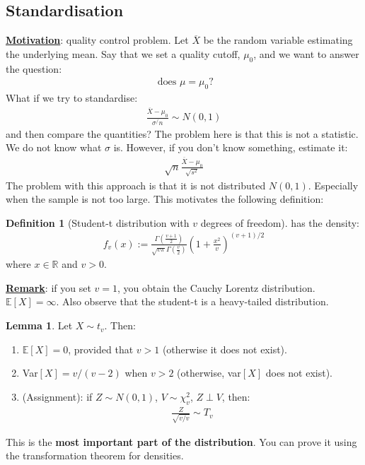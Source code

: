 \documentclass[11pt]{scrartcl}
\newcommand{\R}[0]{\mathbb{R}}
\theoremstyle{definition}
\newtheorem{lemma}[theorem]{Lemma}
\newtheorem{definition}{Definition}
\theoremstyle{remark}
\newcommand{\dfn}[1]{\textbf{\underline{#1}}}
\newcommand{\EX}[1]{\mathbb{E}\left[#1 \right]}
\begin{document}
{\subsection{Standardisation}
\dfn{Motivation}: quality control problem. Let $\overline{X}$ be the random variable estimating the underlying mean. Say that we set a quality cutoff, $\mu_0$, and we want to answer the question: 
\begin{align*}
	\text{ does } \mu = \mu_0? 	
\end{align*}
What if we try to standardise: 
\begin{align*}
	\frac{\overline{X} - \mu_0}{\sigma^/n}	 \sim N(0,1)
\end{align*}
and then compare the quantities? The problem here is that this is not a statistic. We do not know what $\sigma$ is. However, if you don't know something, estimate it: 
\begin{align*}
	\sqrt{n} \frac{\overline{X} - \mu_0}{\sqrt{s^2} }	
\end{align*}
The problem with this approach is that it is not distributed $N(0,1)$. Especially when the sample is not too large. This motivates the following definition: 

\begin{definition}[Student-t distribution with $v$ degrees of freedom] has the density: 
\begin{align*}
	f_v(x) := \frac{\Gamma \left( \frac{v+1}{2} \right) }{\sqrt{ v \pi} \Gamma \left( 	\frac{v}{2}	\right) }	\left(1+ \frac{x^2}{v}	\right)^{(v+1)/2}
\end{align*}
	where $x \in \R$ and $v > 0$. 
	
\end{definition}

\dfn{Remark}: if you set $v=1$, you obtain the Cauchy Lorentz distribution. $\EX{X} = \infty$. Also observe that the student-t is a heavy-tailed distribution. 

\begin{lemma} Let $X \sim t_v$. Then: 
\begin{enumerate}[noitemsep]
	\item $\EX{X} = 0$, provided that $v> 1$ (otherwise it does not exist). 
	\item Var$[X] = v/(v-2)$ when $v > 2$ (otherwise, var$[X]$ does not exist). 
	\item (Assignment): if $Z \sim N(0,1)$, $V \sim \chi_v^2$, $Z \perp V$, then: 
	\begin{align}
		\frac{Z}{\sqrt{v/v}} \sim T_v 
	\end{align}
\end{enumerate}
	This is the \textbf{most important part of the distribution}. You can prove it using the transformation theorem for densities. 
\end{lemma}

}
\end{document}
